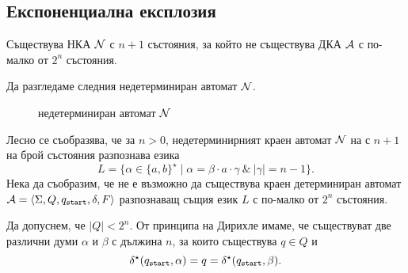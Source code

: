 \subsection{Експоненциална експлозия}\label{sect:regular:nfa:exponential-blowup}

\begin{proposition}
  Съществува НКА $\mathcal{N}$ с $n+1$ състояния, за който не съществува ДКА $\mathcal{A}$ с по-малко от $2^n$ състояния.
\end{proposition}
\begin{hint}
  Да разгледаме следния недетерминиран автомат $\mathcal{N}$.
  \begin{figure}[H]
    \centering
    \caption{недетерминиран автомат $\mathcal{N}$}
    \label{fig:nfa:exp}
  \end{figure}
  
  Лесно се съобразява, че за $n > 0$, недетерминирният краен автомат $\mathcal{N}$ на  с $n+1$ на брой състояния разпознава езика
  \[L = \{\alpha \in \{a,b\}^\star \mid \alpha = \beta \cdot a \cdot \gamma\ \&\ |\gamma| = n-1\}.\]
  Нека да съобразим, че не е възможно да съществува краен детерминиран автомат $\mathcal{A} = \langle{\Sigma,Q,q_{\texttt{start}},\delta,F}\rangle$ разпознаващ същия език $L$ с по-малко от $2^n$ състояния.

  Да допуснем, че $|Q| < 2^n$. От принципа на Дирихле имаме, че съществуват две различни думи $\alpha$ и $\beta$ с дължина $n$,
  за които съществува $q \in Q$ и
  \[\delta^\star(q_{\texttt{start}},\alpha) = q = \delta^\star(q_{\texttt{start}},\beta).\]


\end{hint}
